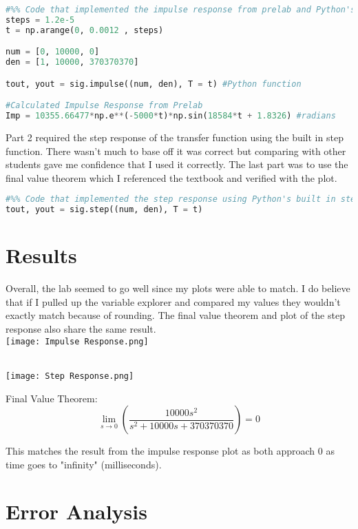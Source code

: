 \documentclass[12pt]{report}
\begin{document}
\begin{lstlisting}[language=Python]
#%% Code that implemented the impulse response from prelab and Python's calculated impulse response
steps = 1.2e-5
t = np.arange(0, 0.0012 , steps)

num = [0, 10000, 0]
den = [1, 10000, 370370370]

tout, yout = sig.impulse((num, den), T = t) #Python function

#Calculated Impulse Response from Prelab
Imp = 10355.66477*np.e**(-5000*t)*np.sin(18584*t + 1.8326) #radians
\end{lstlisting}
Part 2 required the step response of the transfer function using the built in step function. There wasn't much to base off it was correct but comparing with other students gave me confidence that I used it correctly. The last part was to use the final value theorem which I referenced the textbook and verified with the plot. 
\begin{lstlisting}[language=Python]
#%% Code that implemented the step response using Python's built in step function
tout, yout = sig.step((num, den), T = t)
\end{lstlisting}
\section{Results}

Overall, the lab seemed to go well since my plots were able to match. I do believe that if I pulled up the variable explorer and compared my values they wouldn't exactly match because of rounding. The final value theorem and plot of the step response also share the same result. 
\\ \texttt{[image: Impulse Response.png]}

\\ \texttt{[image: Step Response.png]}


Final Value Theorem:
\begin{equation*}
 \lim\limits_{s \to 0} (\frac{10000s^2}{s^2+10000s+370370370}) = 0
\end{equation*}

This matches the result from the impulse response plot as both approach 0 as time goes to "infinity" (milliseconds).





\section{Error Analysis}
\end{document}
